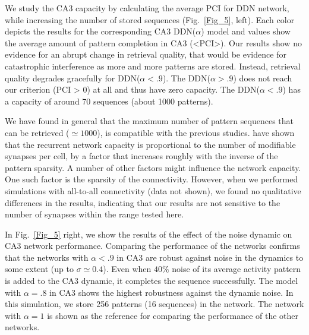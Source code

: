 \documentclass[utf8]{frontiersSCNS} %
\begin{document}
We study the CA3 capacity by calculating the average PCI for DDN network, while increasing the number of stored sequences (Fig.~\ref{Fig_5}, left). 
%
Each color depicts the results for the corresponding CA3 DDN($\alpha$) model and values show the average amount of pattern completion in CA3 (<PCI>).
%
Our results show no evidence for an abrupt change in retrieval quality, that would be evidence for catastrophic interference as more and more patterns are stored. Instead, retrieval quality degrades gracefully for DDN($\alpha < .9$).
The DDN($\alpha > .9$) does not reach our criterion (PCI > 0) at all and thus have zero capacity. The DDN($\alpha < .9$) has a capacity of around 70 sequences (about 1000 patterns).
%
%

We have found in general that the maximum number of pattern sequences that can be retrieved ($\simeq 1000$), is compatible with the previous studies. \citet{treves1994computational} have shown that the recurrent network capacity is proportional to the number of modifiable synapses per cell, by a factor that increases roughly with the inverse of the pattern sparsity. 
%
A number of other factors might influence the network capacity. One such factor is the sparsity of the connectivity. However, when we performed simulations with all-to-all connectivity (data not shown), we found no qualitative differences in the results, indicating that our results are not sensitive to the number of synapses within the range tested here.

In Fig.~\ref{Fig_5} right, we show the results of the effect of the noise dynamic on CA3 network performance. 
Comparing the performance of the networks confirms that the networks with $\alpha < .9$ in CA3 are robust against noise in the dynamics to some extent (up to $\sigma \simeq 0.4$). Even when $ 40 \% $ noise of its average activity pattern is added to the CA3 dynamic, it completes the sequence successfully. 
%
The model with $\alpha = .8$ in CA3 shows the highest robustness against the dynamic noise.
%
In this simulation, we store 256 patterns (16 sequences) in the network. The network with $\alpha = 1$ is shown as the reference for comparing the performance of the other networks.    
 
\end{document}
